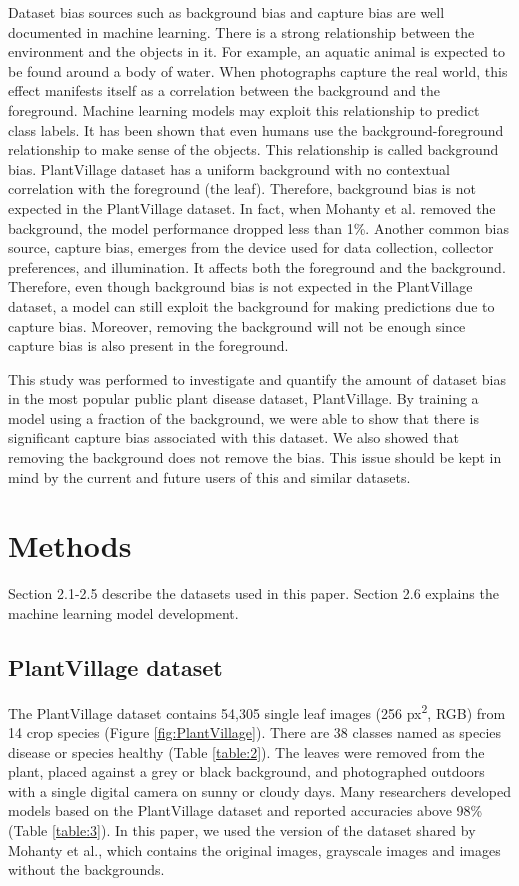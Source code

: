 \documentclass{article}
\begin{document}
Dataset bias sources such as background bias and capture bias are well documented in machine learning\cite{Torralba2011, Tommasi2015}. There is a strong relationship between the environment and the objects in it. For example, an aquatic animal is expected to be found around a body of water. When photographs capture the real world, this effect manifests itself as a correlation between the background and the foreground. Machine learning models may exploit this relationship to predict class labels\cite{Logan2020}. It has been shown that even humans use the background-foreground relationship to make sense of the objects\cite{Torralba2003}. This relationship is called background bias. PlantVillage dataset has a uniform background with no contextual correlation with the foreground (the leaf). Therefore, background bias is not expected in the PlantVillage dataset. In fact, when Mohanty et al.\cite{Mohanty2016} removed the background, the model performance dropped less than 1\%. Another common bias source, capture bias\cite{Torralba2011, Tommasi2015}, emerges from the device used for data collection, collector preferences, and illumination. It affects both the foreground and the background. Therefore, even though background bias is not expected in the PlantVillage dataset, a model can still exploit the background for making predictions due to capture bias. Moreover, removing the background will not be enough since capture bias is also present in the foreground.

This study was performed to investigate and quantify the amount of dataset bias in the most popular public plant disease dataset, PlantVillage. By training a model using a fraction of the background, we were able to show that there is significant capture bias associated with this dataset. We also showed that removing the background does not remove the bias.  This issue should be kept in mind by the current and future users of this and similar datasets.

\section{Methods}
Section 2.1-2.5 describe the datasets used in this paper. Section 2.6 explains the machine learning model development.

\subsection{PlantVillage dataset}

The PlantVillage dataset contains 54,305 single leaf images (256 px\textsuperscript{2}, RGB) from 14 crop species (Figure \ref{fig:PlantVillage}). There are 38 classes named as species disease or species healthy (Table \ref{table:2}). The leaves were removed from the plant, placed against a grey or black background, and photographed outdoors with a single digital camera on sunny or cloudy days. Many researchers developed models based on the PlantVillage dataset and reported accuracies above 98\% (Table \ref{table:3}). In this paper, we used the version of the dataset shared by Mohanty et al., which contains the original images, grayscale images and images without the backgrounds\cite{Mohanty2016}.
\end{document}
